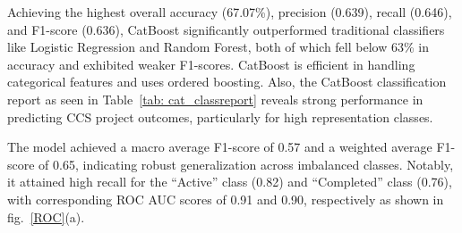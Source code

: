 \documentclass[conference]{IEEEtran}
\begin{document}
  
\begin{table}[!htbp]
\centering
\caption{performance comparison of ml models for ccs status prediction}
\label{tab:model_perf}
\end{table}


Achieving the highest overall accuracy (67.07\%), precision (0.639), recall (0.646), and F1-score (0.636), CatBoost significantly outperformed traditional classifiers like Logistic Regression and Random Forest, both of which fell below 63\% in accuracy and exhibited weaker F1-scores. CatBoost is efficient in handling categorical features and uses ordered boosting. Also, the CatBoost classification report as seen in Table~\ref{tab: cat_classreport} reveals strong performance in predicting CCS project outcomes, particularly for high representation classes. 

The model achieved a macro average F1-score of 0.57 and a weighted average F1-score of 0.65, indicating robust generalization across imbalanced classes. Notably, it attained high recall for the “Active” class (0.82) and “Completed” class (0.76), with corresponding ROC AUC scores of 0.91 and 0.90, respectively as shown in fig.~\ref{ROC}(a).
\end{document}
